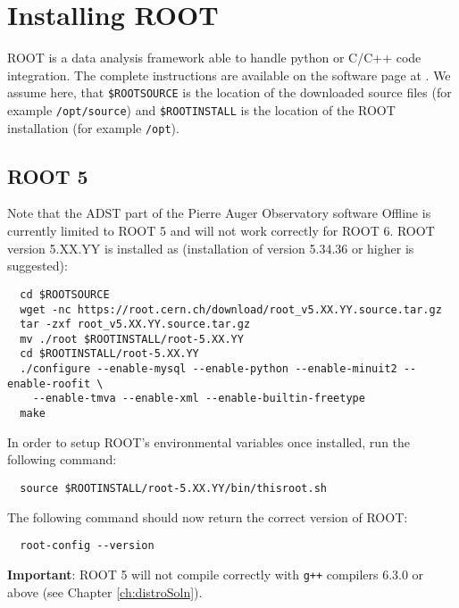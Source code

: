\documentclass[12pt,a4paper]{report}
\begin{document}
\section{Installing ROOT}
ROOT is a data analysis framework able to handle python or C/C++ code integration. The complete instructions are available on the software page at \cite{root}. We assume here, that \texttt{\$ROOTSOURCE} is the location of the downloaded source files (for example \texttt{/opt/source}) and \texttt{\$ROOTINSTALL} is the location of the ROOT installation (for example \texttt{/opt}).
\subsection{ROOT 5}
Note that the ADST part of the Pierre Auger Observatory software Offline \cite{offline} is currently limited to ROOT 5 and will not work correctly for ROOT 6. ROOT version 5.XX.YY is installed as (installation of version 5.34.36 or higher is suggested):
\footnotesize
\begin{verbatim}
  cd $ROOTSOURCE
  wget -nc https://root.cern.ch/download/root_v5.XX.YY.source.tar.gz
  tar -zxf root_v5.XX.YY.source.tar.gz
  mv ./root $ROOTINSTALL/root-5.XX.YY
  cd $ROOTINSTALL/root-5.XX.YY
  ./configure --enable-mysql --enable-python --enable-minuit2 --enable-roofit \
    --enable-tmva --enable-xml --enable-builtin-freetype
  make
\end{verbatim}
\normalsize
In order to setup ROOT's environmental variables once installed, run the following command:
\footnotesize
\begin{verbatim}
  source $ROOTINSTALL/root-5.XX.YY/bin/thisroot.sh
\end{verbatim}
\normalsize
The following command should now return the correct version of ROOT:
\footnotesize
\begin{verbatim}
  root-config --version
\end{verbatim}
\normalsize
\textbf{Important}: ROOT 5 will not compile correctly with \texttt{g++} compilers 6.3.0 or above (see Chapter \ref{ch:distroSoln}).
\end{document}
